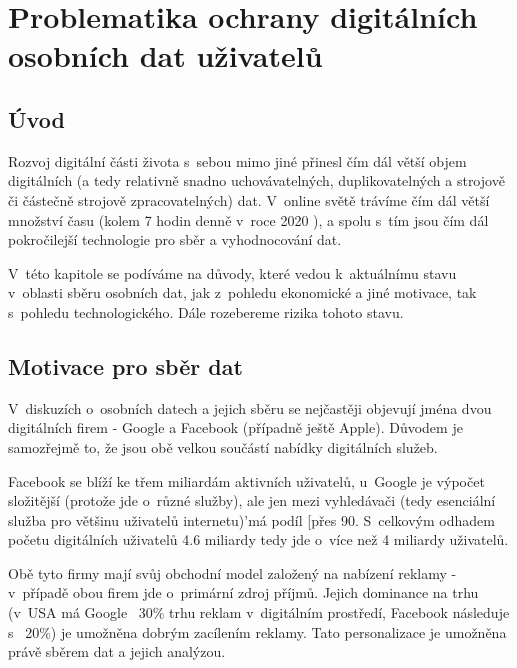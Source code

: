 \chapter{Problematika ochrany digitálních osobních dat uživatelů}

\section{Úvod}
Rozvoj digitální části života s~sebou mimo jiné přinesl čím dál větší objem digitálních (a tedy relativně snadno uchovávatelných, duplikovatelných a strojově či částečně strojově zpracovatelných) dat. V~online světě trávíme čím dál větší množství času (kolem 7 hodin denně v~roce 2020 \citep{digital-2021-report}), a spolu s~tím jsou čím dál pokročilejší technologie pro sběr a vyhodnocování dat.

V~této kapitole se podíváme na důvody, které vedou k~aktuálnímu stavu v~oblasti sběru osobních dat, jak z~pohledu ekonomické a jiné motivace, tak s~pohledu technologického. Dále rozebereme rizika tohoto stavu.

\section{Motivace pro sběr dat}

V~diskuzích o~osobních datech a jejich sběru se nejčastěji objevují jména dvou digitálních firem - Google a Facebook (případně ještě Apple). Důvodem je samozřejmě to, že jsou obě velkou součástí nabídky digitálních služeb.

Facebook se blíží ke třem miliardám aktivních uživatelů\citep{facebook-active-users}, u~Google je výpočet složitější (protože jde o~různé služby), ale jen mezi vyhledávači (tedy esenciální služba pro většinu uživatelů internetu)'má podíl [přes 90\citep{google-search}. S~celkovým odhadem početu digitálních uživatelů 4.6 miliardy\citep{digital-2021-report} tedy jde o~více než 4 miliardy uživatelů.

Obě tyto firmy mají svůj obchodní model založený na nabízení reklamy - v~případě obou firem jde o~primární zdroj příjmů. Jejich dominance na trhu (v~USA má Google ~30\% trhu reklam\citep{google-ads} v~digitálním prostředí, Facebook následuje s ~20\%) je umožněna dobrým zacílením reklamy. Tato personalizace je umožněna právě sběrem dat a jejich analýzou.


